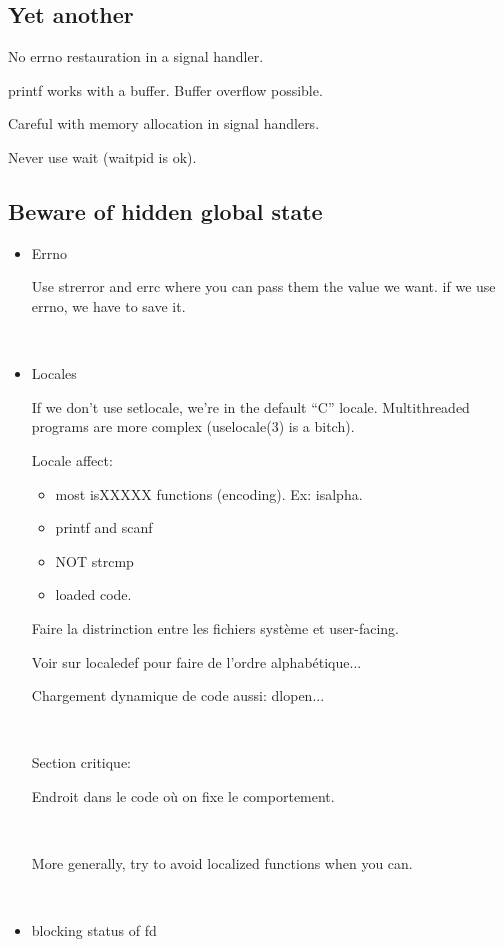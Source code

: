 \documentclass[a4paper,11pt]{article}
\begin{document}
\subsection{Yet another}

No errno restauration in a signal handler.

printf works with a buffer. Buffer overflow possible.

Careful with memory allocation in signal handlers.

Never use wait (waitpid is ok).

\subsection{Beware of hidden global state}

\begin{itemize}
\item Errno

  Use strerror and errc where you can pass them the value we want. if we use
  errno, we have to save it.

  \

\item Locales

  If we don't use setlocale, we're in the default ``C'' locale. Multithreaded
  programs are more complex (uselocale(3) is a bitch).

  Locale affect:
  \begin{itemize}
  \item most isXXXXX functions (encoding). Ex: isalpha.
  \item printf and scanf
  \item NOT strcmp
  \item loaded code.
  \end{itemize}

  Faire la distrinction entre les fichiers système et user-facing.

  Voir sur localedef pour faire de l'ordre alphabétique...

  Chargement dynamique de code aussi: dlopen...

  \

  Section critique:

  Endroit dans le code où on fixe le comportement.

  \

  More generally, try to avoid localized functions when you can.

  \

\item blocking status of fd


\end{itemize}
\end{document}
